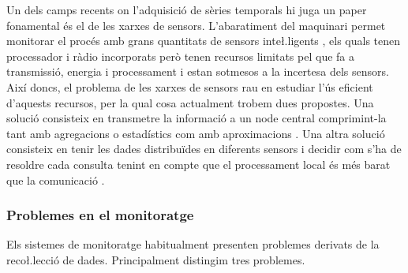 Un dels camps recents on l'adquisició de sèries temporals hi juga un
paper fonamental és el de les xarxes de sensors. L'abaratiment del
maquinari permet monitorar el procés amb grans quantitats de sensors
inte\l.ligents \parencite{jainagrawal05,yaogehrke02}, els quals tenen
processador i ràdio incorporats però tenen recursos limitats pel que
fa a transmissió, energia i processament i estan sotmesos a la
incertesa dels sensors. Així doncs, el problema de les xarxes de
sensors rau en estudiar l'ús eficient d'aquests recursos, per la qual
cosa actualment trobem dues propostes.  Una solució consisteix en
transmetre la informació a un node central comprimint-la tant amb
agregacions o estadístics com amb
aproximacions \parencite{deligiannakis07}.  Una altra solució
consisteix en tenir les dades distribuïdes en diferents sensors i
decidir com s'ha de resoldre cada consulta tenint en compte que el
processament local és més barat que la
comunicació \parencite{yaogehrke02,gehrkemadden04,bonnet01,kim12:aggregate_sensor_networks}.



\subsubsection{Problemes en el monitoratge}


Els sistemes de monitoratge habitualment presenten problemes derivats
de la reco\l.lecció de dades. Principalment distingim tres problemes.



